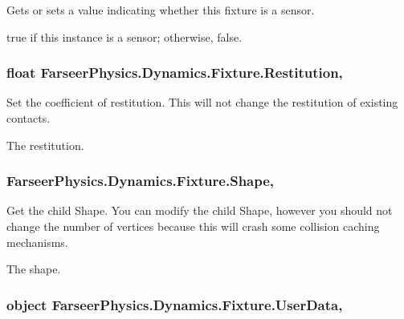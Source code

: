 Gets or sets a value indicating whether this fixture is a sensor. 

{\ttfamily true} if this instance is a sensor; otherwise, {\ttfamily false}.\hypertarget{class_farseer_physics_1_1_dynamics_1_1_fixture_ac74572f8c152aee3b0bd1bc9b7d3795d}{
\subsubsection[{Restitution}]{\setlength{\rightskip}{0pt plus 5cm}float Farseer\+Physics.\+Dynamics.\+Fixture.\+Restitution\hspace{0.3cm}{\ttfamily [get]}, {\ttfamily [set]}}}\label{class_farseer_physics_1_1_dynamics_1_1_fixture_ac74572f8c152aee3b0bd1bc9b7d3795d}


Set the coefficient of restitution. This will not change the restitution of existing contacts. 

The restitution.\hypertarget{class_farseer_physics_1_1_dynamics_1_1_fixture_a239b0bdb90528f2d0ca84eedaa10b76d}{
\subsubsection[{Shape}]{ Farseer\+Physics.\+Dynamics.\+Fixture.\+Shape\hspace{0.3cm}{\ttfamily [get]}, {\ttfamily [set]}}}\label{class_farseer_physics_1_1_dynamics_1_1_fixture_a239b0bdb90528f2d0ca84eedaa10b76d}


Get the child Shape. You can modify the child Shape, however you should not change the number of vertices because this will crash some collision caching mechanisms. 

The shape.\hypertarget{class_farseer_physics_1_1_dynamics_1_1_fixture_a165ac7953eecfa0c338b17c87cbb4376}{
\subsubsection[{User\+Data}]{\setlength{\rightskip}{0pt plus 5cm}object Farseer\+Physics.\+Dynamics.\+Fixture.\+User\+Data\hspace{0.3cm}{\ttfamily [get]}, {\ttfamily [set]}}}\label{class_farseer_physics_1_1_dynamics_1_1_fixture_a165ac7953eecfa0c338b17c87cbb4376}


